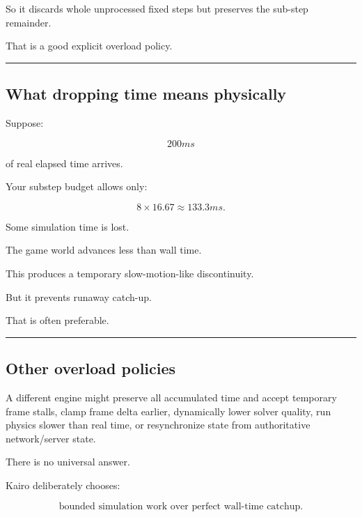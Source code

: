 So it discards whole unprocessed fixed steps but preserves the sub-step remainder.

That is a good explicit overload policy.

\begin{center}\rule{0.5\linewidth}{0.5pt}\end{center}

\subsection{What dropping time means physically}\label{06-engine-ii-ch037-what-dropping-time-means-physically}

\hypertarget{06-engine-ii-ch037-what-dropping-time-means-physically}{}

Suppose:

\[
200ms
\]

of real elapsed time arrives.

Your substep budget allows only:

\[
8\times16.67
\approx133.3ms.
\]

Some simulation time is lost.

The game world advances less than wall time.

This produces a temporary slow-motion-like discontinuity.

But it prevents runaway catch-up.

That is often preferable.

\begin{center}\rule{0.5\linewidth}{0.5pt}\end{center}

\subsection{Other overload policies}\label{06-engine-ii-ch037-other-overload-policies}

\hypertarget{06-engine-ii-ch037-other-overload-policies}{}

A different engine might preserve all accumulated time and accept temporary frame stalls, clamp frame delta earlier, dynamically lower solver quality, run physics slower than real time, or resynchronize state from authoritative network/server state.

There is no universal answer.

Kairo deliberately chooses:

\[
\boxed{
\text{bounded simulation work over perfect wall-time catchup}.
}
\]

